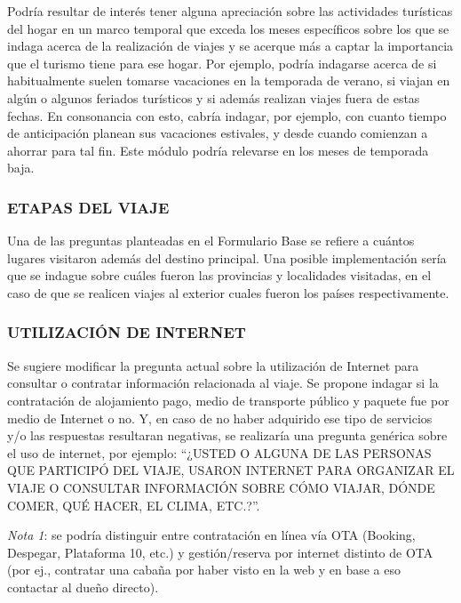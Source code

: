 \documentclass[
  openany]{book}
\begin{document}
Podría resultar de interés tener alguna apreciación sobre las actividades turísticas del hogar en un marco temporal que exceda los meses específicos sobre los que se indaga acerca de la realización de viajes y se acerque más a captar la importancia que el turismo tiene para ese hogar.
Por ejemplo, podría indagarse acerca de si habitualmente suelen tomarse vacaciones en la temporada de verano, si viajan en algún o algunos feriados turísticos y si además realizan viajes fuera de estas fechas.
En consonancia con esto, cabría indagar, por ejemplo, con cuanto tiempo de anticipación planean sus vacaciones estivales, y desde cuando comienzan a ahorrar para tal fin.
Este módulo podría relevarse en los meses de temporada baja.

\hypertarget{etapas-del-viaje}{%
\subsubsection{\texorpdfstring{\textbf{ETAPAS DEL VIAJE}}{ETAPAS DEL VIAJE}}\label{etapas-del-viaje}}

Una de las preguntas planteadas en el Formulario Base se refiere a cuántos lugares visitaron además del destino principal.
Una posible implementación sería que se indague sobre cuáles fueron las provincias y localidades visitadas, en el caso de que se realicen viajes al exterior cuales fueron los países respectivamente.

\hypertarget{utilizaciuxf3n-de-internet}{%
\subsubsection{\texorpdfstring{\textbf{UTILIZACIÓN DE INTERNET}}{UTILIZACIÓN DE INTERNET}}\label{utilizaciuxf3n-de-internet}}

Se sugiere modificar la pregunta actual sobre la utilización de Internet para consultar o contratar información relacionada al viaje.
Se propone indagar si la contratación de alojamiento pago, medio de transporte público y paquete fue por medio de Internet o no.
Y, en caso de no haber adquirido ese tipo de servicios y/o las respuestas resultaran negativas, se realizaría una pregunta genérica sobre el uso de internet, por ejemplo: ``¿USTED O ALGUNA DE LAS PERSONAS QUE PARTICIPÓ DEL VIAJE, USARON INTERNET PARA ORGANIZAR EL VIAJE O CONSULTAR INFORMACIÓN SOBRE CÓMO VIAJAR, DÓNDE COMER, QUÉ HACER, EL CLIMA, ETC.?''.

\emph{Nota 1}: se podría distinguir entre contratación en línea vía OTA (Booking, Despegar, Plataforma 10, etc.) y gestión/reserva por internet distinto de OTA (por ej., contratar una cabaña por haber visto en la web y en base a eso contactar al dueño directo).
\end{document}
